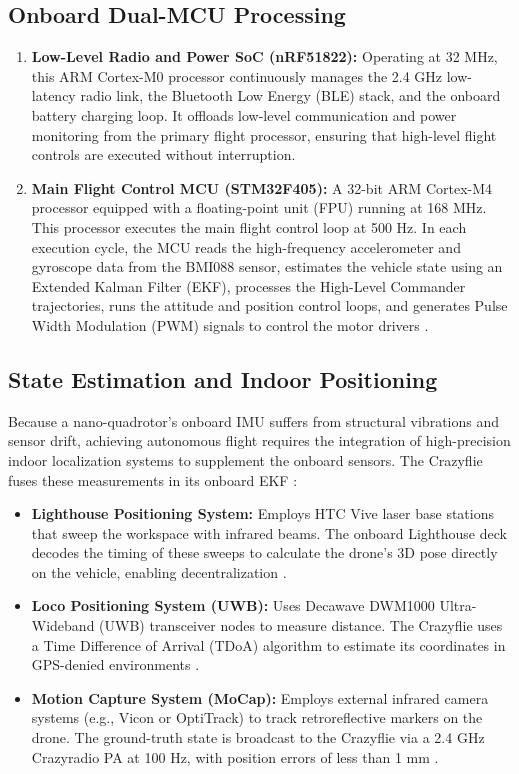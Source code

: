 \subsection{Onboard Dual-MCU Processing}
\begin{enumerate}
    \item \textbf{Low-Level Radio and Power SoC (nRF51822):} Operating at 32 MHz, this ARM Cortex-M0 processor continuously manages the 2.4 GHz low-latency radio link, the Bluetooth Low Energy (BLE) stack, and the onboard battery charging loop. It offloads low-level communication and power monitoring from the primary flight processor, ensuring that high-level flight controls are executed without interruption.
    \item \textbf{Main Flight Control MCU (STM32F405):} A 32-bit ARM Cortex-M4 processor equipped with a floating-point unit (FPU) running at 168 MHz. This processor executes the main flight control loop at 500 Hz. In each execution cycle, the MCU reads the high-frequency accelerometer and gyroscope data from the BMI088 sensor, estimates the vehicle state using an Extended Kalman Filter (EKF), processes the High-Level Commander trajectories, runs the attitude and position control loops, and generates Pulse Width Modulation (PWM) signals to control the motor drivers \cite{ref_54}.
\end{enumerate}

\subsection{State Estimation and Indoor Positioning}
Because a nano-quadrotor's onboard IMU suffers from structural vibrations and sensor drift, achieving autonomous flight requires the integration of high-precision indoor localization systems to supplement the onboard sensors. The Crazyflie fuses these measurements in its onboard EKF \cite{ref_41, ref_54}:
\begin{itemize}
    \item \textbf{Lighthouse Positioning System:} Employs HTC Vive laser base stations that sweep the workspace with infrared beams. The onboard Lighthouse deck decodes the timing of these sweeps to calculate the drone's 3D pose directly on the vehicle, enabling decentralization \cite{ref_55}.
    \item \textbf{Loco Positioning System (UWB):} Uses Decawave DWM1000 Ultra-Wideband (UWB) transceiver nodes to measure distance. The Crazyflie uses a Time Difference of Arrival (TDoA) algorithm to estimate its coordinates in GPS-denied environments \cite{ref_55}.
    \item \textbf{Motion Capture System (MoCap):} Employs external infrared camera systems (e.g., Vicon or OptiTrack) to track retroreflective markers on the drone. The ground-truth state is broadcast to the Crazyflie via a 2.4 GHz Crazyradio PA at 100 Hz, with position errors of less than 1 mm \cite{ref_39}.
\end{itemize}

